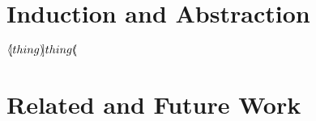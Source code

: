 \documentclass{report}[12pt]
\begin{document}



\chapter{Induction and Abstraction}
$\langle \hspace{-2pt} [ thing )\!] thing ( \hspace{-3.5pt} \langle$




% 



% 





\chapter{Related and Future Work}


\newpage


\end{document}

